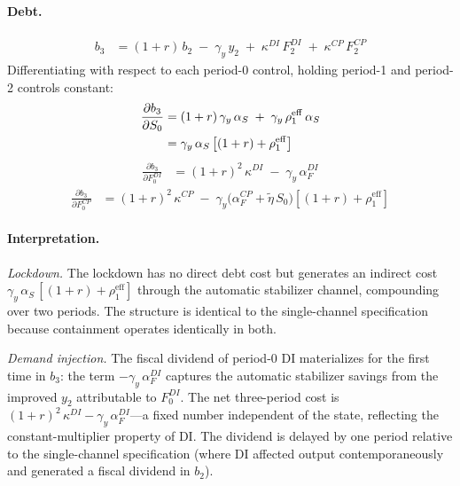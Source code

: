 \documentclass[12pt, a4paper]{article}
\begin{document}
\paragraph{Debt.}
%
\begin{align}
    b_3 &= (1+r)\, b_2 \;-\; \gamma_y\, y_2
          \;+\; \kappa^{DI}\, F_2^{DI}
          \;+\; \kappa^{CP}\, F_2^{CP}
    \label{eq:b3_recursive_corr}
\end{align}
%
Differentiating with respect to each period-0 control, holding period-1 and
period-2 controls constant:
%
\begin{align}
    \frac{\partial b_3}{\partial S_0}
      &= (1+r)\, \gamma_y\, \alpha_S
        \;+\; \gamma_y\, \rho_1^{\mathrm{eff}}\, \alpha_S
    \notag \\
      &= \gamma_y\, \alpha_S
         \left[(1+r) + \rho_1^{\mathrm{eff}}\right]
    \label{eq:db3_dS0_corr}
\end{align}
%
\begin{align}
    \frac{\partial b_3}{\partial F_0^{DI}}
      &= (1+r)^2\, \kappa^{DI}
        \;-\; \gamma_y\, \alpha_F^{DI}
    \label{eq:db3_dDI0_corr}
\end{align}
%
\begin{align}
    \frac{\partial b_3}{\partial F_0^{CP}}
      &= (1+r)^2\, \kappa^{CP}
        \;-\; \gamma_y\bigl(\alpha_F^{CP} + \tilde{\eta}\, S_0\bigr)
         \left[(1+r) + \rho_1^{\mathrm{eff}}\right]
    \label{eq:db3_dCP0_corr}
\end{align}

\paragraph{Interpretation.}

\textit{Lockdown.} The lockdown has no direct debt cost but generates an
indirect cost $\gamma_y\, \alpha_S\, [(1+r) + \rho_1^{\mathrm{eff}}]$
through the automatic stabilizer channel, compounding over two periods. The
structure is identical to the single-channel specification because containment
operates identically in both.

\textit{Demand injection.} The fiscal dividend of period-0 DI materializes for
the first time in $b_3$: the term $-\gamma_y\, \alpha_F^{DI}$ captures the
automatic stabilizer savings from the improved $y_2$ attributable to
$F_0^{DI}$. The net three-period cost is
$(1+r)^2\, \kappa^{DI} - \gamma_y\, \alpha_F^{DI}$---a fixed number
independent of the state, reflecting the constant-multiplier property of DI.
The dividend is delayed by one period relative to the single-channel
specification (where DI affected output contemporaneously and generated a
fiscal dividend in $b_2$).
\end{document}
